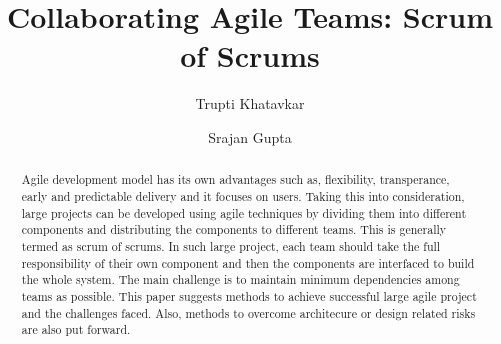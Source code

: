 \documentclass[sigconf]{acmart}
\begin{document}
%
\title{Collaborating Agile Teams: Scrum of Scrums}

%

\author{Trupti Khatavkar}

\author{Srajan Gupta}

%
\begin{abstract}
Agile development model has its own advantages such as, flexibility, transperance, early and predictable delivery and it focuses on users. Taking this into consideration, large projects can be developed using agile techniques by dividing them into different components and distributing the components to different teams. This is generally termed as scrum of scrums. In such large project, each team should take the full responsibility of their own component and then the components are interfaced to build the whole system. The main challenge is to maintain minimum dependencies among teams as possible. This paper suggests methods to achieve successful large agile project and the challenges faced. Also, methods to overcome architecure or design related risks are also put forward.
\end{abstract}


%

%


%
\maketitle
\end{document}
